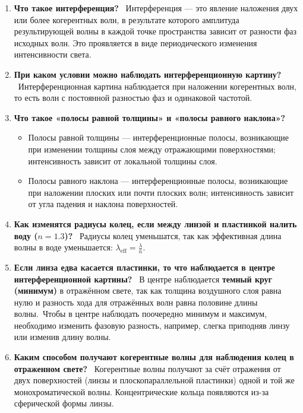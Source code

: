 \documentclass[14pt, a4paper, twoside]{extreport}
\begin{document}
\begin{enumerate}
  \item \textbf{Что такое интерференция?} \
    Интерференция — это явление наложения двух или более когерентных волн, в результате которого амплитуда результирующей волны в каждой точке пространства зависит от разности фаз исходных волн. Это проявляется в виде периодического изменения интенсивности света.

  \item \textbf{При каком условии можно наблюдать интерференционную картину?} \
    Интерференционная картина наблюдается при наложении когерентных волн, то есть волн с постоянной разностью фаз и одинаковой частотой.

  \item \textbf{Что такое «полосы равной толщины» и «полосы равного наклона»?} \
    \begin{itemize}
      \item Полосы равной толщины — интерференционные полосы, возникающие при изменении толщины слоя между отражающими поверхностями; интенсивность зависит от локальной толщины слоя.
      \item Полосы равного наклона — интерференционные полосы, возникающие при наложении плоских или почти плоских волн; интенсивность зависит от угла падения и наклона поверхностей.
    \end{itemize}

  \item \textbf{Как изменятся радиусы колец, если между линзой и пластинкой налить воду ($n=1.3$)?} \
    Радиусы колец уменьшатся, так как эффективная длина волны в воде уменьшается:
    $
    \lambda_\text{eff} = \frac{\lambda}{n}.
    $

  \item \textbf{Если линза едва касается пластинки, то что наблюдается в центре интерференционной картины?} \
    В центре наблюдается \textbf{темный круг (минимум)} в отражённом свете, так как толщина воздушного слоя равна нулю и разность хода для отражённых волн равна половине длины волны.\
    Чтобы в центре наблюдать поочередно минимум и максимум, необходимо изменить фазовую разность, например, слегка приподняв линзу или изменив длину волны.

  \item \textbf{Каким способом получают когерентные волны для наблюдения колец в отраженном свете?} \
    Когерентные волны получают за счёт отражения от двух поверхностей (линзы и плоскопараллельной пластинки) одной и той же монохроматической волны. Концентрические кольца появляются из-за сферической формы линзы.


\end{enumerate}
\end{document}
